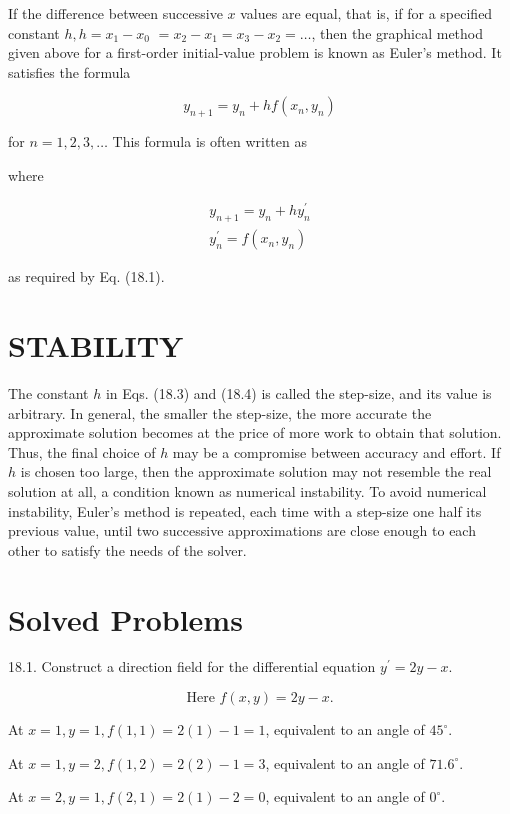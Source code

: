 \documentclass[10pt]{article}
\begin{document}
If the difference between successive $x$ values are equal, that is, if for a specified constant $h, h=x_{1}-x_{0}$ $=x_{2}-x_{1}=x_{3}-x_{2}=\ldots$, then the graphical method given above for a first-order initial-value problem is known as Euler's method. It satisfies the formula


\begin{equation*}
y_{n+1}=y_{n}+h f\left(x_{n}, y_{n}\right) \tag{18.3}
\end{equation*}


for $n=1,2,3, \ldots$ This formula is often written as

where


\begin{gather*}
y_{n+1}=y_{n}+h y_{n}^{\prime}  \tag{18.4}\\
y_{n}^{\prime}=f\left(x_{n}, y_{n}\right) \tag{18.5}
\end{gather*}


as required by Eq. (18.1).

\section*{STABILITY}
The constant $h$ in Eqs. (18.3) and (18.4) is called the step-size, and its value is arbitrary. In general, the smaller the step-size, the more accurate the approximate solution becomes at the price of more work to obtain that solution. Thus, the final choice of $h$ may be a compromise between accuracy and effort. If $h$ is chosen too large, then the approximate solution may not resemble the real solution at all, a condition known as numerical instability. To avoid numerical instability, Euler's method is repeated, each time with a step-size one half its previous value, until two successive approximations are close enough to each other to satisfy the needs of the solver.

\section*{Solved Problems}
18.1. Construct a direction field for the differential equation $y^{\prime}=2 y-x$.

$$
\text { Here } f(x, y)=2 y-x \text {. }
$$

At $x=1, y=1, f(1,1)=2(1)-1=1$, equivalent to an angle of $45^{\circ}$.

At $x=1, y=2, f(1,2)=2(2)-1=3$, equivalent to an angle of $71.6^{\circ}$.

At $x=2, y=1, f(2,1)=2(1)-2=0$, equivalent to an angle of $0^{\circ}$.
\end{document}
